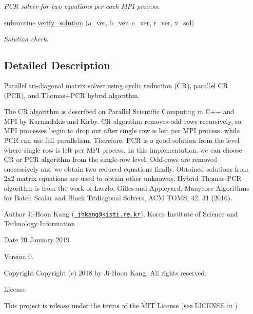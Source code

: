 \begin{DoxyCompactItemize}
\begin{DoxyCompactList}\small\item\em P\+CR solver for two equations per each M\+PI process. \end{DoxyCompactList}\item 
subroutine \mbox{\hyperlink{namespacetdma__parallel_a9c627d634cb17863dd5ab60b3f4f8d11}{verify\+\_\+solution}} (a\+\_\+ver, b\+\_\+ver, c\+\_\+ver, r\+\_\+ver, x\+\_\+sol)
\begin{DoxyCompactList}\small\item\em Solution check. \end{DoxyCompactList}\end{DoxyCompactItemize}


\subsection{Detailed Description}
Parallel tri-\/diagonal matrix solver using cyclic reduction (CR), parallel CR (P\+CR), and Thomas+\+P\+CR hybrid algorithm. 

The CR algorithm is described on Parallel Scientific Computing in C++ and M\+PI by Karniadakis and Kirby. CR algorithm removes odd rows recursively, so M\+PI processes begin to drop out after single row is left per M\+PI process, while P\+CR can use full parallelism. Therefore, P\+CR is a good solution from the level where single row is left per M\+PI process. In this implementation, we can choose CR or P\+CR algorithm from the single-\/row level. Odd-\/rows are removed successively and we obtain two reduced equations finally. Obtained solutions from 2x2 matrix equations are used to obtain other unknowns. Hybrid Thomas-\/\+P\+CR algorithm is from the work of Laszlo, Gilles and Appleyard, Manycore Algorithms for Batch Scalar and Block Tridiagonal Solvers, A\+CM T\+O\+MS, 42, 31 (2016).

\begin{DoxyAuthor}{Author}
Ji-\/\+Hoon Kang (\href{mailto:jhkang@kisti.re.kr}{\texttt{ jhkang@kisti.\+re.\+kr}}), Korea Institute of Science and Technology Information 
\end{DoxyAuthor}
\begin{DoxyDate}{Date}
20 January 2019 
\end{DoxyDate}
\begin{DoxyVersion}{Version}
0. 
\end{DoxyVersion}
\begin{DoxyParagraph}{Copyright}
Copyright (c) 2018 by Ji-\/\+Hoon Kang. All rights reserved. 
\end{DoxyParagraph}
\begin{DoxyParagraph}{License }

\end{DoxyParagraph}
This project is release under the terms of the M\+IT License (see L\+I\+C\+E\+N\+SE in ) 

